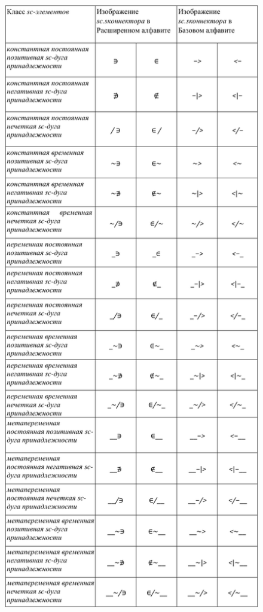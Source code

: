 \begin{figure}[h]
	\centering
	\includegraphics[scale=0.3]{images/intro/scs_membership_connectors_0.png}
\end{figure}


